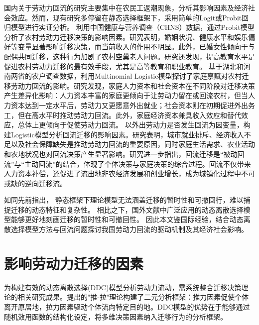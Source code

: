 \documentclass[
  a4paper,
  zihao=-4,
  fontset=mac,
  AutoFakeBold,
  AutoFakeSlant,
  oneside]{ctexbook}
\begin{document}
国内关于劳动力回流的研究主要集中在农民工返潮现象，分析其影响因素及经济社会效应。然而，现有研究多停留在静态选择框架下，采用简单的Logit或Probit回归模型进行实证分析。
\textcite{WangZhiQiangZhongGuoNongCunLaoDongLiQianYiYingXiangYinSuYanJiuJiYuProbitMoXingDeShiZhengFenXi2011}利用中国健康与营养调查（CHNS）数据，通过Probit模型分析了农村劳动力迁移决策的影响因素。研究表明，婚姻状况、健康水平和娱乐偏好等变量显著影响迁移决策，而当前收入的作用不明显。此外，已婚女性倾向于与配偶共同迁移，这种行为加剧了农村空巢老人问题。研究还发现，提高教育水平是促进农村劳动力迁移的最有效手段，尤其是高等教育和职业教育。
\textcite{ShiZhiLeiJiaTingBingFuJiaTingJueCeYuNongCunQianYiLaoDongLiHuiLiu2012}基于湖北和河南两省的农户调查数据，利用Multinomial Logistic模型探讨了家庭禀赋对农村迁移劳动力回流的影响。研究发现，家庭人力资本和社会资本在不同阶段对迁移决策产生差异化影响：人力资本丰富的家庭更倾向于让劳动力留在或回流农村，但当人力资本达到一定水平后，劳动力又更愿意外出就业；社会资本则在初期促进外出务工，但在高水平时推动劳动力回流。此外，家庭经济资本兼具收入效应和替代效应，总体上更倾向于促使劳动力回流。
\textcite{RenYuanNongCunWaiChuLaoDongLiHuiLiuQianYiDeYingXiangYinSuHeHuiLiuXiaoYing2017}以外出劳动力是否发生回流为因变量，构建Logistic模型分析回流迁移的影响因素。研究表明，城市就业排斥、经济收入不足以及社会保障缺失是推动劳动力回流的重要原因，同时家庭生活需求、农业活动和农地状况也对回流决策产生显著影响。研究进一步指出，回流迁移是“被动回流”与“主动回流”的结合，体现了个体决策与家庭决策的综合过程。回流不仅带来人力资本补偿，还促进了流出地非农经济发展和创业增长，成为城镇化过程中不可或缺的逆向迁移流。


如同先前指出，
静态框架下理论模型无法涵盖迁移的暂时性和可撤回行，难以捕捉迁移的动态特征和复杂性。
相比之下，国外文献中广泛应用的动态离散选择模型能够更好地刻画迁移的暂时性和可撤回性。
因此本文鉴国际经验，结合动态离散选择模型方法与回流问题探讨我国劳动力回流的驱动机制及其经济社会影响。


\section{影响劳动力迁移的因素}
\label{sec:_影响劳动力迁移的因素}

为构建有效的动态离散选择(DDC)模型分析劳动力流动，需系统整合迁移决策理论的相关研究成果。\textcite{leeTheoryMigration1966}提出的"推-拉"理论构建了二元分析框架：推力因素促使个体离开原居地，拉力因素驱动个体流向特定目的地。DDC模型的优势在于能够通过随机效用函数的结构化设定，将多维决策因素纳入迁移行为的分析框架。
\end{document}

